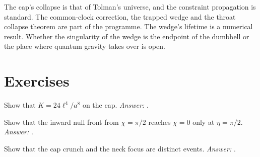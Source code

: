 \begin{standsbox}
The cap's collapse is that of Tolman's universe, and the constraint propagation is standard. The common-clock correction, the trapped wedge and the throat collapse theorem are part of the programme. The wedge's lifetime is a numerical result. Whether the singularity of the wedge is the endpoint of the dumbbell or the place where quantum gravity takes over is open. \open
\end{standsbox}

\section*{Exercises}
\begin{exercise}Show that $K=24\ell^4/a^8$ on the cap. \emph{Answer:} .\end{exercise}
\begin{exercise}Show that the inward null front from $\chi=\pi/2$ reaches $\chi=0$ only at $\eta=\pi/2$. \emph{Answer:} .\end{exercise}
\begin{exercise}Show that the cap crunch and the neck focus are distinct events. \emph{Answer:} .\end{exercise}
